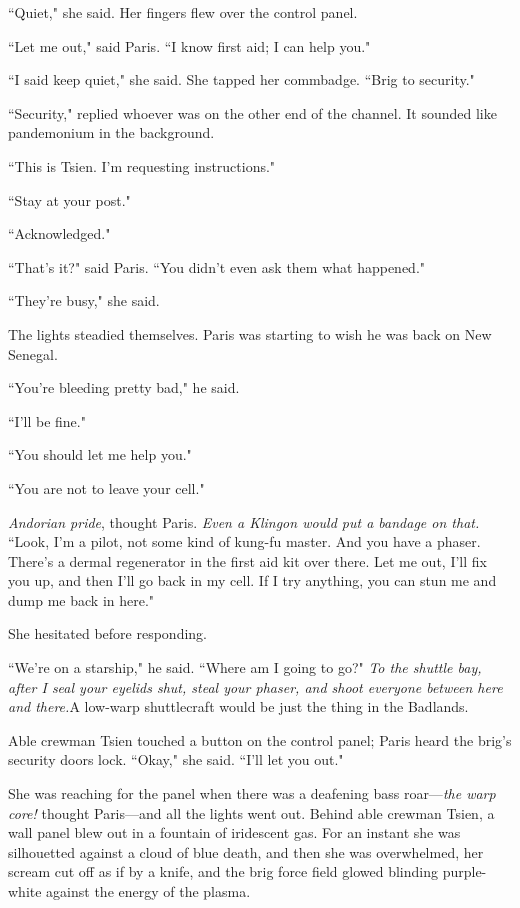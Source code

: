 \documentclass[twoside,letterpaper,12pt]{memoir}
\begin{document}
``Quiet," she said. Her fingers flew over the control panel.

``Let me out," said Paris. ``I know first aid; I can help you."

``I said keep quiet," she said. She tapped her commbadge. ``Brig to security."

``Security," replied whoever was on the other end of the channel. It sounded like pandemonium in the background.

``This is Tsien. I'm requesting instructions."

``Stay at your post."

``Acknowledged."

``That's it?" said Paris. ``You didn't even ask them what happened."

``They're busy," she said.

The lights steadied themselves. Paris was starting to wish he was back on New Senegal.

``You're bleeding pretty bad," he said.

``I'll be fine."

``You should let me help you."

``You are not to leave your cell."

\textit{Andorian pride}, thought Paris. \textit{Even a Klingon would put a bandage on that.} ``Look, I'm a pilot, not some kind of kung-fu master. And you have a phaser. There's a dermal regenerator in the first aid kit over there. Let me out, I'll fix you up, and then I'll go back in my cell. If I try anything, you can stun me and dump me back in here."

She hesitated before responding.

``We're on a starship," he said. ``Where am I going to go?" \textit{To the shuttle bay, after I seal your eyelids shut, steal your phaser, and shoot everyone between here and there.}A low-warp shuttlecraft would be just the thing in the Badlands.

Able crewman Tsien touched a button on the control panel; Paris heard the brig's security doors lock. ``Okay," she said. ``I'll let you out."

She was reaching for the panel when there was a deafening bass roar---\textit{the warp core!} thought Paris---and all the lights went out. Behind able crewman Tsien, a wall panel blew out in a fountain of iridescent gas. For an instant she was silhouetted against a cloud of blue death, and then she was overwhelmed, her scream cut off as if by a knife, and the brig force field glowed blinding purple-white against the energy of the plasma.
\end{document}

